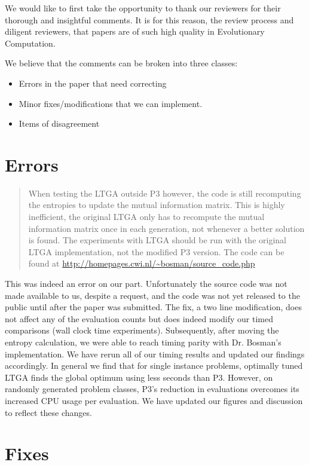 \documentclass[]{article}
\begin{document}
We would like to first take the opportunity to thank our reviewers for their thorough and insightful comments. It is for this reason, the review process and diligent reviewers, that papers are of such high quality in Evolutionary Computation.

We believe that the comments can be broken into three classes:
\begin{itemize}
\item Errors in the paper that need correcting
\item Minor fixes/modifications that we can implement.
\item Items of disagreement
\end{itemize}

\section{Errors}
\begin{quote}
 When testing the LTGA outside P3 however, the code is still recomputing the entropies to update the mutual information matrix. This is highly inefficient, the original LTGA only has to recompute the mutual information matrix once in each generation, not whenever a better solution is found. The experiments with LTGA should be run with the original LTGA implementation, not the modified P3 version. The code can be found at \url{http://homepages.cwi.nl/~bosman/source_code.php}
\end{quote}

This was indeed an error on our part. Unfortunately the source code was not made available to us, despite a request,
and the code was not yet released to the public until after the paper was submitted. The fix,
a two line modification, does not affect any of the evaluation counts but does indeed modify our
timed comparisons (wall clock time experiments). Subsequently, after moving the entropy calculation,
we were able to reach timing parity with Dr. Bosman's implementation. We have rerun all of our timing results
and updated our findings accordingly. In general we find that for single instance problems,
optimally tuned LTGA %
finds the global optimum using less seconds than P3. However, on randomly generated problem classes,
P3's reduction in evaluations overcomes its increased CPU usage per evaluation.
We have updated our figures and discussion to reflect these changes.

\section{Fixes}
\end{document}
